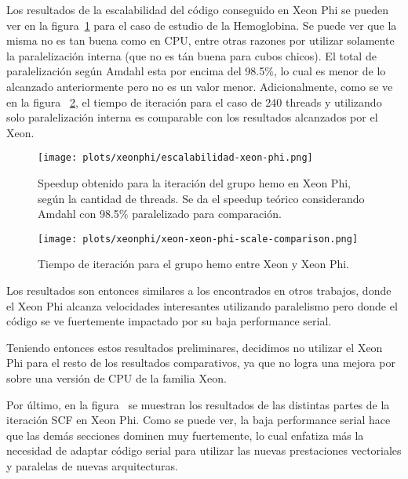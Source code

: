 Los resultados de la escalabilidad del c\'odigo conseguido en Xeon Phi se pueden ver
en la figura~\ref{fig:xeon-final-scalability} para el caso de estudio de la Hemoglobina.
Se puede ver que la misma no es tan buena como en CPU, entre otras razones por utilizar
solamente la paralelizaci\'on interna (que no es t\'an buena para cubos chicos). El total de paralelizaci\'on seg\'un
Amdahl esta por encima del 98.5\%, lo cual es menor de lo alcanzado anteriormente
pero no es un valor menor. Adicionalmente, como se ve en la figura
~\ref{fig:xeon-xeon-phi-parallelized-iteration}, el tiempo de iteraci\'on
para el caso de 240 threads y utilizando solo paralelizaci\'on interna es
comparable con los resultados alcanzados por el Xeon.

\begin{figure}[htbp]
   \centering
   \texttt{[image: plots/xeonphi/escalabilidad-xeon-phi.png]}
   \caption{Speedup obtenido para la iteraci\'on del grupo hemo en Xeon Phi,
   seg\'un la cantidad de threads. Se da el speedup te\'orico considerando Amdahl
   con 98.5\% paralelizado para comparaci\'on.}
   \label{fig:xeon-final-scalability}
\end{figure}

\begin{figure}[htbp]
   \centering
   \texttt{[image: plots/xeonphi/xeon-xeon-phi-scale-comparison.png]}
   \caption{Tiempo de iteraci\'on para el grupo hemo entre Xeon y Xeon Phi.}
   \label{fig:xeon-xeon-phi-parallelized-iteration}
\end{figure}

Los resultados son entonces similares a los encontrados en otros trabajos,
donde el Xeon Phi alcanza velocidades interesantes utilizando paralelismo
pero donde el c\'odigo se ve fuertemente impactado por su baja performance serial.

Teniendo entonces estos resultados preliminares, decidimos no utilizar el Xeon Phi
para el resto de los resultados comparativos, ya que no logra una mejora por sobre
una versi\'on de CPU de la familia Xeon.

Por \'ultimo, en la figura~\label{fig:group-times-scf-xeon-phi} se muestran los resultados
de las distintas partes de la iteraci\'on SCF en Xeon Phi. Como se puede ver, la baja performance
serial hace que las dem\'as secciones dominen muy fuertemente, lo cual enfatiza m\'as la necesidad
de adaptar c\'odigo serial para utilizar las nuevas prestaciones vectoriales y paralelas de nuevas
arquitecturas.

